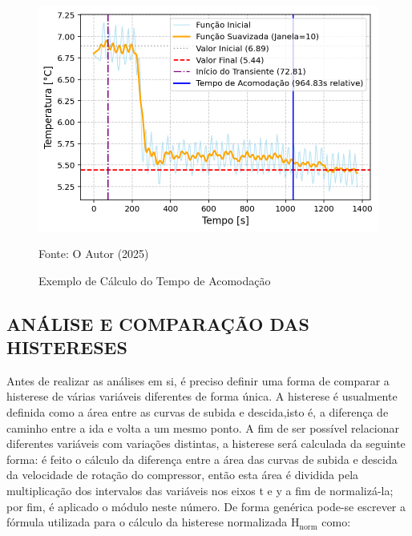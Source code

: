 \begin{figure}[h]
    \centering
    \includegraphics[width=1\linewidth]{FigurasdoTexto/Exemplo tempo de acomodação.png}
    \caption{Exemplo de Cálculo do Tempo de Acomodação}
    \label{fig:exemplo de cálculo do tempo de acomodação}
    {\footnotesize Fonte: O Autor (2025)}
\end{figure}
\subsection{\MakeUppercase{Análise e Comparação das Histereses}} \label{subsec:Método de Análise da Histerese}

Antes de realizar as análises em si, é preciso definir uma forma de comparar a histerese de várias variáveis diferentes de forma única. A histerese é usualmente definida como a área entre as curvas de subida e descida,isto é, a diferença de caminho entre a ida e volta a um mesmo ponto. A fim de ser possível relacionar diferentes variáveis com variações distintas, a histerese será calculada da seguinte forma: é feito o cálculo da diferença entre a área das curvas de subida e descida da velocidade de rotação do compressor, então esta área é dividida pela multiplicação dos intervalos das variáveis nos eixos t e y a fim de normalizá-la; por fim, é aplicado o módulo neste número. De forma genérica pode-se escrever a fórmula utilizada para o cálculo da histerese normalizada $\text{H}_\text{norm}$ como:

